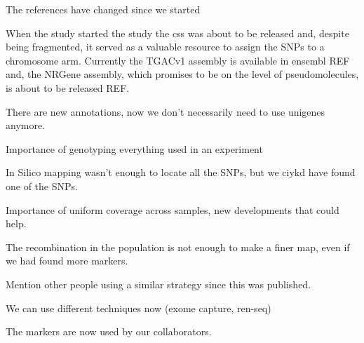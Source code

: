 The references have changed since we started

When the study started the study the \gls{css} was about to be released and, despite being fragmented, it served as a valuable resource to assign the SNPs to a chromosome arm. Currently the TGACv1 assembly is available in ensembl REF and,  the NRGene assembly, which promises to be on the level of pseudomolecules, is about to be released REF. 


There are new annotations, now we don't necessarily need to use unigenes anymore. 

Importance of genotyping everything used in an experiment

In Silico mapping wasn't enough to locate all the SNPs, but we ciykd have found one of the SNPs. 

Importance of uniform coverage across samples, new developments that could help. 

The recombination in the population is not enough to make a finer map, even if we had found more markers. 

Mention other people using a similar strategy since this was published. 

We can use different techniques now (exome capture, ren-seq)

The markers are now used by our collaborators. 